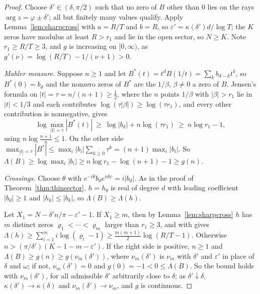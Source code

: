 \documentclass[11pt]{article}
\begin{document}
\begin{proof}
Choose $\delta'\in(\delta,\pi/2)$ such that no zero of $B$ other than $0$ lies
on the rays $\arg z=\varphi\pm\delta'$; all but finitely many values qualify.
Apply Lemma~\ref{lem:sharpcross} with $a=R/T$ and $b=R$, so
$\varepsilon'=\kappa(\delta')d/\log T$; the $K$ zeros have modulus at least
$R>r_1$ and lie in the open sector, so $N\ge K$.  Note $r_1\ge R/T\ge3$, and
$g$ is increasing on $[0,\infty)$, as $g'(\nu)=\log(R/T)-1/(\nu+1)>0$.

\emph{Mahler measure.}  Suppose $n\ge1$ and let
$B^*(t)=t^dB(1/t)=\sum_kb_{d-k}t^k$, so $B^*(0)=b_d$ and the nonzero zeros of
$B^*$ are the $1/\beta$, $\beta\ne0$ a zero of $B$.  Jensen's formula on
$|t|=\tau=n/(n+1)\ge\frac12$, where the $n$ points $1/\beta$ with
$|\beta|>r_1$ lie in $|t|<1/3$ and each contributes $\log(\tau|\beta|)\ge\log(\tau r_1)$,
and every other contribution is nonnegative, gives
\[
  \log\max_{|t|=\tau}|B^*(t)|\ \ge\ \log|b_d|+n\log(\tau r_1)\ \ge\ n\log r_1-1,
\]
using $n\log\frac{n+1}n\le1$.  On the other side
$\max_{|t|=\tau}|B^*|\le\max_i|b_i|\sum_{k\ge0}\tau^k=(n+1)\max_i|b_i|$.  So
$\Lambda(B)\ge\log\max_i|b_i|\ge n\log r_1-\log(n+1)-1\ge g(n)$.

\emph{Crossings.}  Choose $\theta$ with $e^{-i\theta}b_de^{id\psi}=i|b_d|$.  As
in the proof of Theorem~\ref{thm:thinsector}, $h=h_\theta$ is real of degree
$d$ with leading coefficient $|b_d|\ge1$ and $|h_k|\le|b_k|$, so
$\Lambda(B)\ge\Lambda(h)$.

Let $X_1=N-\delta'n/\pi-\varepsilon'-1$.  If $X_1\ge m$, then by
Lemma~\ref{lem:sharpcross} $h$ has $m$ distinct zeros
$\varrho_1<\cdots<\varrho_m$ larger than $r_1\ge3$, and \cite[Theorem~3.2]{coefficient-mass} with \cite[Corollary~3.4]{coefficient-mass} gives
$\Lambda(h)\ge\sum_{i=1}^mi\log(\varrho_i-1)\ge\frac{m(m+1)}2\log(R/T-1)$.
Otherwise $n>(\pi/\delta')(K-1-m-\varepsilon')$.  If the right side is positive,
$n\ge1$ and $\Lambda(B)\ge g(n)\ge g(\nu_m(\delta'))$, where $\nu_m(\delta')$
is $\nu_m$ with $\delta'$ and $\varepsilon'$ in place of $\delta$ and $\omega$; if not,
$\nu_m(\delta')=0$ and $g(0)=-1<0\le\Lambda(B)$.  So the bound holds with
$\nu_m(\delta')$, for all admissible $\delta'$ arbitrarily close to $\delta$;
as $\delta'\downarrow\delta$, $\kappa(\delta')\to\kappa(\delta)$ and
$\nu_m(\delta')\to\nu_m$, and $g$ is continuous.

\end{proof}
\end{document}
